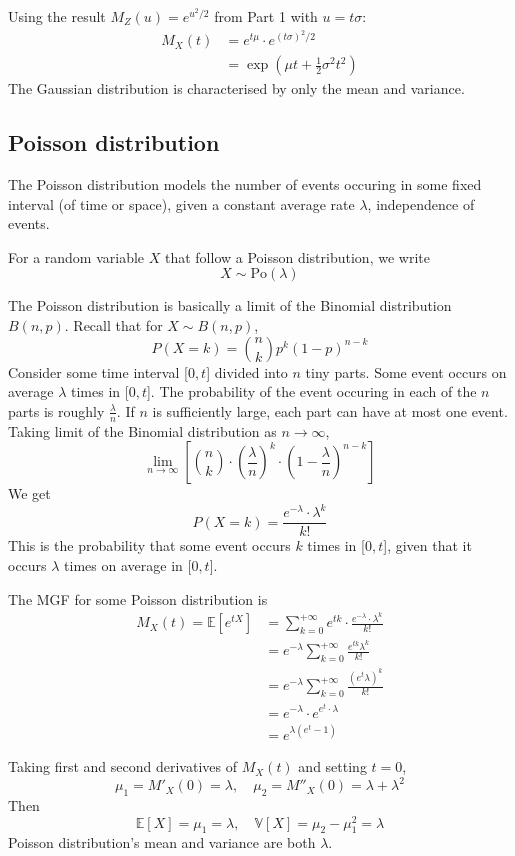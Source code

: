 \documentclass[../Probability.tex]{subfiles}
\begin{document}
\noindent Using the result $M_Z(u) = e^{u^2/2}$ from Part 1 with $u = t\sigma$:
\begin{align*}
    M_X(t) &= e^{t\mu} \cdot e^{(t\sigma)^2 / 2} \\
           &= \exp\left(\mu t + \frac{1}{2}\sigma^2 t^2\right)
\end{align*}
\noindent The Gaussian distribution is characterised by only the mean and variance.

\subsection{Poisson distribution}
The Poisson distribution models the number of events occuring in some fixed interval (of time or space),
given a constant average rate $\lambda$, independence of events.

\medskip

\noindent For a random variable $X$ that follow a Poisson distribution, we write
\[X\sim \text{Po}(\lambda)\]

\noindent The Poisson distribution is basically a limit of the Binomial distribution $B(n,p)$.\newline
Recall that for $X\sim B(n,p)$,
\[P(X=k)=\binom{n}{k}p^k(1-p)^{n-k}\]
Consider some time interval [$0,t$] divided into $n$ tiny parts. Some event occurs on average $\lambda$ times in [$0,t$].\newline
The probability of the event occuring in each of the $n$ parts is roughly $\frac{\lambda}{n}$.\newline
If $n$ is sufficiently large, each part can have at most one event.\newline
Taking limit of the Binomial distribution as $n\rightarrow\infty$,
\[\lim\limits_{n\to \infty}\left[\binom{n}{k} \cdot (\frac{\lambda}{n})^k \cdot (1-\frac{\lambda}{n})^{n-k} \right]\]
We get
\[P(X=k)=\frac{e^{-\lambda} \cdot \lambda^k}{k!}\]
This is the probability that some event occurs $k$ times in [$0,t$], 
given that it occurs $\lambda$ times on average in [$0,t$].



\noindent The MGF for some Poisson distribution is
\begin{align*}
    M_X(t)=\mathbb{E}[e^{tX}]&=\sum_{k=0}^{+\infty}e^{tk}\cdot\frac{e^{-\lambda} \cdot \lambda^k}{k!}\\
    &=e^{-\lambda}\sum_{k=0}^{+\infty}\frac{e^{tk}\lambda^k}{k!} \\
    &=e^{-\lambda}\sum_{k=0}^{+\infty}\frac{(e^t\lambda)^k}{k!} \\
    &=e^{-\lambda}\cdot e^{e^{t}\cdot \lambda} \\
    &=e^{\lambda(e^t-1)}
\end{align*}

\noindent Taking first and second derivatives of $M_X(t)$ and setting $t=0$,
\[\mu_1=M'_X(0)=\lambda, \quad \mu_2=M''_X(0)=\lambda + \lambda^2\]
Then
\[\mathbb{E}[X]=\mu_1=\lambda, \quad \mathbb{V}[X]=\mu_2-\mu_1^2=\lambda\]
Poisson distribution's mean and variance are both $\lambda$.
\end{document}
